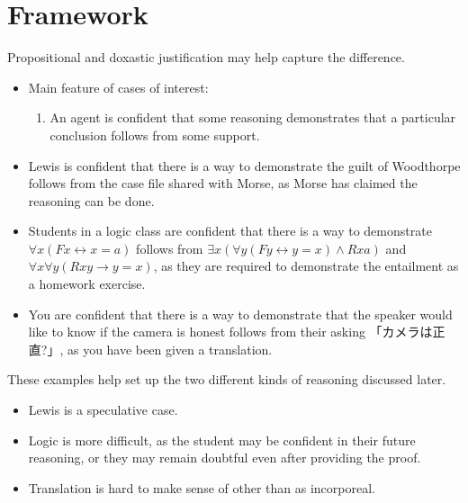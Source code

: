 \documentclass[10pt]{article}
\begin{document}
\newpage


\section{Framework}
\label{sec:framework-1}

\begin{note}
  Propositional and doxastic justification may help capture the difference.
\end{note}

\begin{itemize}
\item Main feature of cases of interest:
  \begin{enumerate}
  \item An agent is confident that some reasoning demonstrates that a particular conclusion follows from some support.
  \end{enumerate}
\end{itemize}

\begin{itemize}
\item Lewis is confident that there is a way to demonstrate the guilt of Woodthorpe follows from the case file shared with Morse, as Morse has claimed the reasoning can be done.
\item Students in a logic class are confident that there is a way to demonstrate \(\forall x(Fx \leftrightarrow x = a)\) follows from \(\exists x(\forall y(Fy \leftrightarrow y = x) \land Rxa)\) and \(\forall x\forall y(Rxy \rightarrow y = x)\), as they are required to demonstrate the entailment as a homework exercise.
\item You are confident that there is a way to demonstrate that the speaker would like to know if the camera is honest follows from their asking 「カメラは正直?」, as you have been given a translation.
\end{itemize}

\begin{note}
  These examples help set up the two different kinds of reasoning discussed later.
  \begin{itemize}
  \item Lewis is a speculative case.
  \item Logic is more difficult, as the student may be confident in their future reasoning, or they may remain doubtful even after providing the proof.
  \item Translation is hard to make sense of other than as incorporeal.
  \end{itemize}
\end{note}
\end{document}
